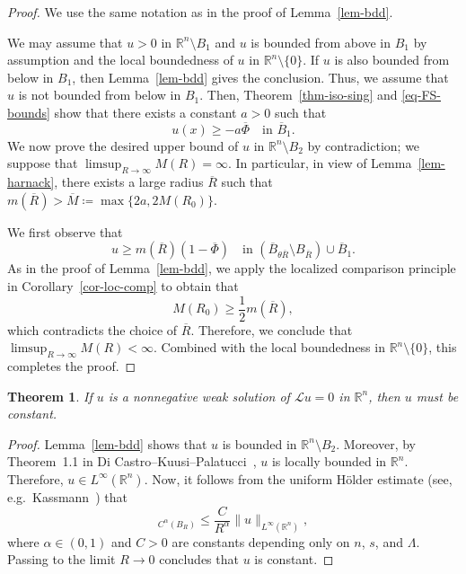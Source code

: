 \documentclass[11pt]{amsart}
\theoremstyle{plain}
\newtheorem{theorem}{Theorem}[section]
\theoremstyle{definition}
\numberwithin{equation}{section}
\begin{document}
\begin{proof}
We use the same notation as in the proof of Lemma~\ref{lem-bdd}.

We may assume that $u>0$ in $\mathbb{R}^n \setminus B_1$ and $u$ is bounded from above in $B_1$ by assumption and the local boundedness of $u$ in $\mathbb{R}^n \setminus \{0\}$. If $u$ is also bounded from below in $B_1$, then Lemma~\ref{lem-bdd} gives the conclusion. Thus, we assume that $u$ is not bounded from below in $B_1$. Then, Theorem~\ref{thm-iso-sing} and \eqref{eq-FS-bounds} show that there exists a constant $a>0$ such that
\begin{equation*}
    u(x) \geq -a\overline \Phi \quad \text{in $\overline B_1$}.
\end{equation*}
We now prove the desired upper bound of $u$ in $\mathbb{R}^n \setminus B_2$ by contradiction; we suppose that $\limsup_{R \to \infty}M(R)=\infty$. In particular, in view of Lemma~\ref{lem-harnack}, there exists a large radius $\overline{R}$ such that $m(\overline R) >\overline M \coloneqq \max\{2a, 2M(R_0)\}$.

We first observe that
\begin{equation*}
    u \geq m(\overline R)(1-\overline{\Phi}) \quad\text{in }(\overline{B}_{\theta \overline R} \setminus B_{\overline R}) \cup \overline{B}_1.
\end{equation*}
As in the proof of Lemma~\ref{lem-bdd}, we apply the localized comparison principle in Corollary~\ref{cor-loc-comp} to obtain that
\begin{equation*}
M(R_0) \geq \frac{1}{2}m(\overline R),
\end{equation*}
which contradicts the choice of $\overline R$. Therefore, we conclude that $\limsup_{R \to \infty}M(R)<\infty$. Combined with the local boundedness in $\mathbb{R}^n \setminus \{0\}$, this completes the proof.
\end{proof}



\begin{theorem}\label{thm-Liouv-weak}
If $u$ is a nonnegative weak solution of $\mathcal{L}u=0$ in $\mathbb{R}^n$, then $u$ must be constant.
\end{theorem}

\begin{proof}
Lemma~\ref{lem-bdd} shows that $u$ is bounded in $\mathbb{R}^n \setminus B_2$. Moreover, by Theorem~1.1 in Di Castro--Kuusi--Palatucci~\cite{DCKP16}, $u$ is locally bounded in $\mathbb{R}^n$. Therefore, $u \in L^\infty(\mathbb{R}^n)$. Now, it follows from the uniform H\"older estimate (see, e.g.\ Kassmann~\cite[Theorem~1.1]{Kas09}) that
\begin{equation*}
    [u]_{C^\alpha(B_R)} \leq \frac{C}{R^\alpha} \|u\|_{L^\infty(\mathbb{R}^n)},
\end{equation*}
where $\alpha \in (0,1)$ and $C>0$ are constants depending only on $n$, $s$, and $\Lambda$. Passing to the limit $R \to 0$ concludes that $u$ is constant.
\end{proof}
\end{document}

